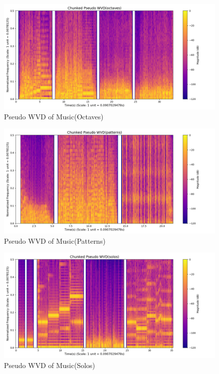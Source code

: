 \documentclass[12pt,a4paper,onecolumn]{exam}
\begin{document}
\begin{solution}
        \begin{figure}[H]
        \centering
        \includegraphics[scale = 0.45]{music_octaves_pwvd.png}
        \caption{Pseudo WVD of Music(Octaves)}
        \label{fig:44}
        \end{figure}    

        \begin{figure}[H]
        \centering
        \includegraphics[scale = 0.45]{music_patterns_pwvd.png}
        \caption{Pseudo WVD of Music(Patterns)}
        \label{fig:45}
        \end{figure}   

        \begin{figure}[H]
        \centering
        \includegraphics[scale = 0.45]{music_solos_pwvd.png}
        \caption{Pseudo WVD of Music(Solos)}
        \label{fig:46}
        \end{figure}    


\end{solution}
\end{document}
